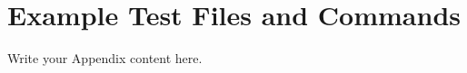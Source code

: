 
\chapter{Example Test Files and Commands} %

\label{AppendixA} %


Write your Appendix content here.